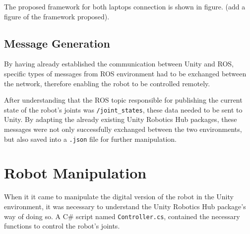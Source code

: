 The proposed framework for both laptops connection is shown in figure. (add a figure of the framework proposed).




\subsection{Message Generation}

By having already established the communication between Unity and ROS, specific types of messages from ROS environment had to be exchanged between the network, therefore enabling the robot to be controlled remotely.

After understanding that the ROS topic responsible for publishing the current state of the robot's joints was \texttt{/joint\_states}, these data needed to be sent to Unity. By adapting the already existing Unity Robotics Hub packages, these messages were not only successfully exchanged between the two environments, but also saved into a \texttt{.json} file for further manipulation.

\section{Robot Manipulation}
When it it came to manipulate the digital version of the robot in the Unity environment, it was necessary to understand the Unity Robotics Hub package's way of doing so. A C\# script named \texttt{Controller.cs}, contained the necessary functions to control the robot's joints.


